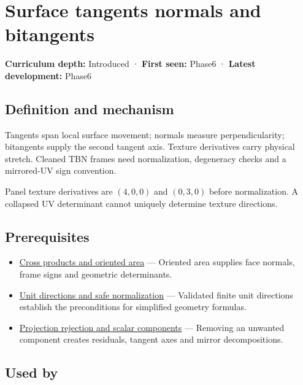 \hypertarget{appendix-e31893dec985}{}
\section{Surface tangents normals and bitangents}\label{appendix-e31893dec985-surface-tangents-normals-and-bitangents}

\textbf{Curriculum depth:} Introduced · \textbf{First seen:} Phase6 · \textbf{Latest development:} Phase6

\subsection{Definition and mechanism}\label{appendix-e31893dec985-definition-and-mechanism}

Tangents span local surface movement; normals measure perpendicularity; bitangents supply the second tangent axis. Texture derivatives carry physical stretch. Cleaned TBN frames need normalization, degeneracy checks and a mirrored-UV sign convention.

Panel texture derivatives are \((4,0,0)\) and \((0,3,0)\) before normalization. A collapsed UV determinant cannot uniquely determine texture directions.

\subsection{Prerequisites}\label{appendix-e31893dec985-prerequisites}

\begin{itemize}
\tightlist
\item
  \hyperref[appendix-2391db8052b1]{Cross products and oriented area} --- Oriented area supplies face normals, frame signs and geometric determinants.
\item
  \hyperref[appendix-f744e41b95b4]{Unit directions and safe normalization} --- Validated finite unit directions establish the preconditions for simplified geometry formulas.
\item
  \hyperref[appendix-505a502c372a]{Projection rejection and scalar components} --- Removing an unwanted component creates residuals, tangent axes and mirror decompositions.
\end{itemize}

\subsection{Used by}\label{appendix-e31893dec985-used-by}

